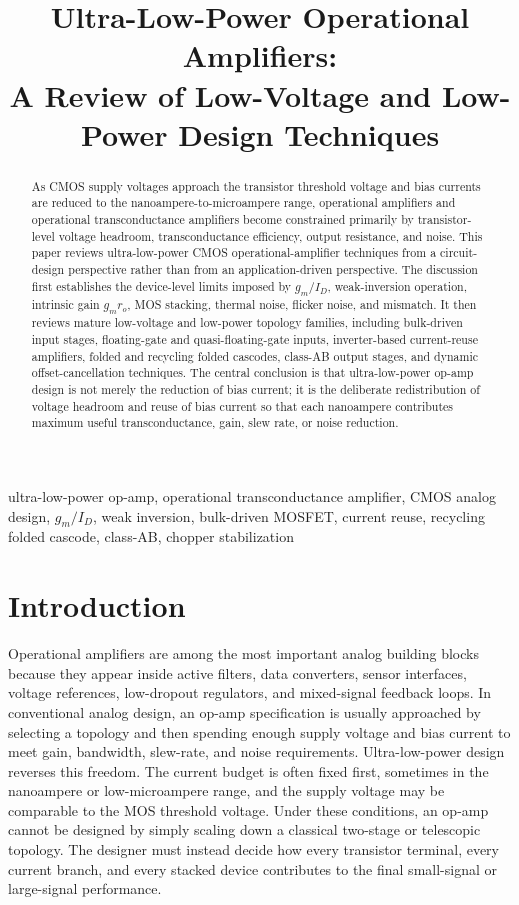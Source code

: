 \documentclass[conference,a4paper]{IEEEtran}
\title{Ultra-Low-Power Operational Amplifiers:\\
A Review of Low-Voltage and Low-Power Design Techniques}
\author{
\IEEEauthorblockN{Reimu Komeiji}
\IEEEauthorblockA{
EE115 Analog Circuits \\
ShanghaiTech University \\
Shanghai, China \\
shenby2024@shanghaitech.edu.cn
}
}
\begin{document}
\maketitle

\begin{abstract}
As CMOS supply voltages approach the transistor threshold voltage and bias currents are reduced to the nanoampere-to-microampere range, operational amplifiers and operational transconductance amplifiers become constrained primarily by transistor-level voltage headroom, transconductance efficiency, output resistance, and noise. This paper reviews ultra-low-power CMOS operational-amplifier techniques from a circuit-design perspective rather than from an application-driven perspective. The discussion first establishes the device-level limits imposed by $g_m/I_D$, weak-inversion operation, intrinsic gain $g_mr_o$, MOS stacking, thermal noise, flicker noise, and mismatch. It then reviews mature low-voltage and low-power topology families, including bulk-driven input stages, floating-gate and quasi-floating-gate inputs, inverter-based current-reuse amplifiers, folded and recycling folded cascodes, class-AB output stages, and dynamic offset-cancellation techniques. The central conclusion is that ultra-low-power op-amp design is not merely the reduction of bias current; it is the deliberate redistribution of voltage headroom and reuse of bias current so that each nanoampere contributes maximum useful transconductance, gain, slew rate, or noise reduction.
\end{abstract}

\begin{IEEEkeywords}
ultra-low-power op-amp, operational transconductance amplifier, CMOS analog design, $g_m/I_D$, weak inversion, bulk-driven MOSFET, current reuse, recycling folded cascode, class-AB, chopper stabilization
\end{IEEEkeywords}

\section{Introduction}
Operational amplifiers are among the most important analog building blocks because they appear inside active filters, data converters, sensor interfaces, voltage references, low-dropout regulators, and mixed-signal feedback loops. In conventional analog design, an op-amp specification is usually approached by selecting a topology and then spending enough supply voltage and bias current to meet gain, bandwidth, slew-rate, and noise requirements. Ultra-low-power design reverses this freedom. The current budget is often fixed first, sometimes in the nanoampere or low-microampere range, and the supply voltage may be comparable to the MOS threshold voltage. Under these conditions, an op-amp cannot be designed by simply scaling down a classical two-stage or telescopic topology. The designer must instead decide how every transistor terminal, every current branch, and every stacked device contributes to the final small-signal or large-signal performance.
\end{document}
